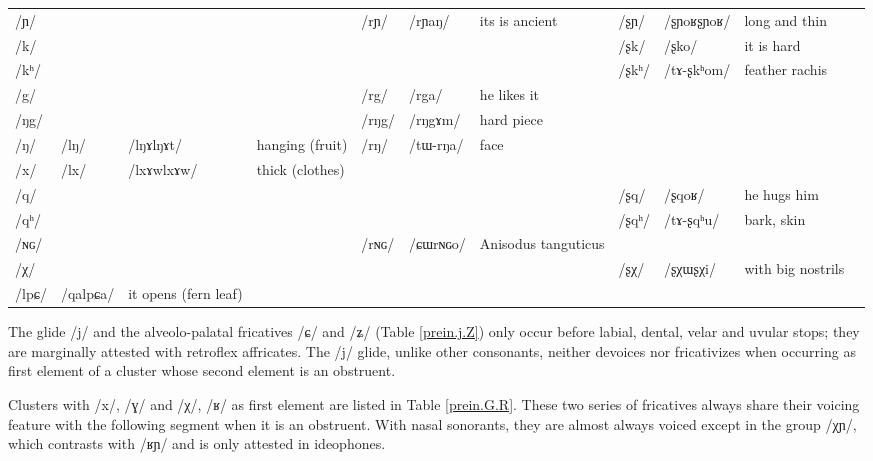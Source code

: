 \documentclass[oldfontcommands,oneside,a4paper,11pt]{article}
\newcommand{\ipa}[1]{/#1/} %
\newcommand{\idph}[1]{\cellcolor{gray}\textbf{#1}}
\begin{document}
\begin{table}
{\begin{tabular}{l|lll|lll|lll|l}
\ipa{ɲ}  & 	  & 	  & 	  & 	 \ipa{rɲ}  & 	 \ipa{rɲaŋ}  & 	 its is ancient & 	 \ipa{ʂɲ} \idph{}  & 	\ipa{ʂɲoʁʂɲoʁ} & 	long and thin & 	\\
\ipa{k}  & 	  & 	  & 	  & 	 & 	 & 	 & 	 \ipa{ʂk}  & 	 \ipa{ʂko}  & 	 it is hard & 	\\
\ipa{kʰ}  & 	  & 	  & 	  & 	 & 	 & 	 & 	 \ipa{ʂkʰ}  & 	 \ipa{tɤ-ʂkʰom}  & 	 feather rachis & 	\\
\ipa{g}  & 	  & 	  & 	  & 	 \ipa{rg}  & 	 \ipa{rga}  & 	 he likes it & 	 & 	 & 	 & 	\\
\ipa{ŋg}  & 	  & 	  & 	  & 	 \ipa{rŋg}  & 	 \ipa{rŋgɤm}  & 	hard piece  & 	 & 	 & 	 & 	\\
\ipa{ŋ}  & 	 \ipa{lŋ} \idph{}  & 	 \ipa{lŋɤlŋɤt}  & 	hanging (fruit)  & 	 \ipa{rŋ}  & 	 \ipa{tɯ-rŋa}  & 	 face & 	 & 	 & 	 & 	\\
\ipa{x}  & 	 \ipa{lx} \idph{}  & 	 \ipa{lxɤwlxɤw}  & 	thick (clothes)  & 	  & 	  & 	  & 	 & 	 & 	 & 	\\
\ipa{q}  & 	  & 	  & 	  & 	 & 	 & 	 & 	 \ipa{ʂq}  & 	 \ipa{ʂqoʁ}  & 	he hugs him  & 	\\
\ipa{qʰ}  & 	  & 	  & 	  & 	 & 	 & 	 & 	 \ipa{ʂqʰ}  & 	 \ipa{tɤ-ʂqʰu}  & 	bark, skin & 	\\
\ipa{ɴɢ}  & 	  & 	  & 	  & 	 \ipa{rɴɢ}  & 	 \ipa{ɕɯrɴɢo}  & 	Anisodus tanguticus  & 	 & 	 & 	 & 	\\
\ipa{χ}  & 	  & 	  & 	  & 	 & 	 & 	 & 	 \ipa{ʂχ}  & 	 \ipa{ʂχɯʂχi}  & 	with big nostrils  & 	\\
\midrule
\ipa{lpɕ}	&\ipa{qalpɕa} & it opens (fern leaf) \\
\bottomrule
\end{tabular}}
\end{table}
 
  The glide /j/  and the alveolo-palatal fricatives /ɕ/ and /ʑ/ (Table \ref{prein.j.Z}) only occur before labial, dental, velar and uvular stops; they are marginally attested with retroflex affricates. The \ipa{j} glide, unlike other consonants, neither devoices nor fricativizes when occurring as first element of a cluster whose second element is an obstruent.


  Clusters with   /x/, /ɣ/ and /χ/, /ʁ/ as first element are listed in Table \ref{prein.G.R}. These two series of fricatives  always share their voicing feature with the following segment when it is an obstruent. With nasal sonorants, they are  almost always voiced except in the group \ipa{χɲ}, which contrasts with \ipa{ʁɲ} and is only attested in ideophones.
  
\end{document}
